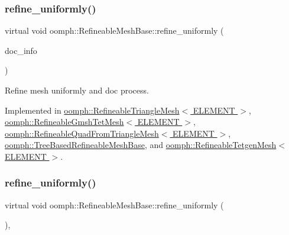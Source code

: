 \subsubsection{\texorpdfstring{refine\+\_\+uniformly()}{refine\_uniformly()}\hspace{0.1cm}{\footnotesize\ttfamily [1/2]}}
{\footnotesize\ttfamily virtual void oomph\+::\+Refineable\+Mesh\+Base\+::refine\+\_\+uniformly (\begin{DoxyParamCaption}\item[{\hyperlink{classoomph_1_1DocInfo}{Doc\+Info} \&}]{doc\+\_\+info }\end{DoxyParamCaption})\hspace{0.3cm}{\ttfamily [pure virtual]}}



Refine mesh uniformly and doc process. 



Implemented in \hyperlink{classoomph_1_1RefineableTriangleMesh_a4820744f95d69328dfa4185fff21dd7b}{oomph\+::\+Refineable\+Triangle\+Mesh$<$ E\+L\+E\+M\+E\+N\+T $>$}, \hyperlink{classoomph_1_1RefineableGmshTetMesh_a8d71e18a1181d79c475217cfab320674}{oomph\+::\+Refineable\+Gmsh\+Tet\+Mesh$<$ E\+L\+E\+M\+E\+N\+T $>$}, \hyperlink{classoomph_1_1RefineableQuadFromTriangleMesh_ab78f50c13f9ccf7d1f359bc443fe2a9d}{oomph\+::\+Refineable\+Quad\+From\+Triangle\+Mesh$<$ E\+L\+E\+M\+E\+N\+T $>$}, \hyperlink{classoomph_1_1TreeBasedRefineableMeshBase_ae238476195a0ceeb2cdb680620fb97a3}{oomph\+::\+Tree\+Based\+Refineable\+Mesh\+Base}, and \hyperlink{classoomph_1_1RefineableTetgenMesh_a5ddc94b2545c82bfb2795583f9b98db2}{oomph\+::\+Refineable\+Tetgen\+Mesh$<$ E\+L\+E\+M\+E\+N\+T $>$}.

\mbox{\label{classoomph_1_1RefineableMeshBase_aa96201d241ce05bb33bce687632470be}} 
\subsubsection{\texorpdfstring{refine\+\_\+uniformly()}{refine\_uniformly()}\hspace{0.1cm}{\footnotesize\ttfamily [2/2]}}
{\footnotesize\ttfamily virtual void oomph\+::\+Refineable\+Mesh\+Base\+::refine\+\_\+uniformly (\begin{DoxyParamCaption}{ }\end{DoxyParamCaption})\hspace{0.3cm}{\ttfamily [inline]}, {\ttfamily [virtual]}}




